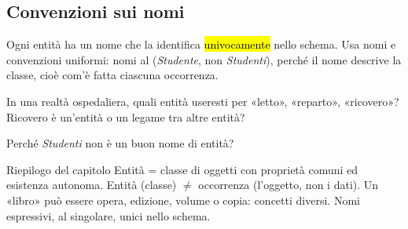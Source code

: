 \subsection{Convenzioni sui nomi}

\begin{consiglio}
Ogni entità ha un nome che la identifica \hl{univocamente} nello schema. Usa nomi  e convenzioni uniformi: nomi al  (\emph{Studente}, non \emph{Studenti}), perché il nome descrive la classe, cioè com'è fatta ciascuna occorrenza.
\end{consiglio}

\begin{esercizi}
\begin{passi}
  \item In una realtà ospedaliera, quali entità useresti per «letto», «reparto», «ricovero»? Ricovero è un'entità o un legame tra altre entità?
  \item Perché \emph{Studenti} non è un buon nome di entità?
\end{passi}
\end{esercizi}

\begin{appunti}{Riepilogo del capitolo}
 Entità = classe di oggetti con proprietà comuni ed esistenza autonoma.
 Entità (classe) $\neq$ occorrenza (l'oggetto, non i dati).
 Un «libro» può essere opera, edizione, volume o copia: concetti diversi.
 Nomi espressivi, al singolare, unici nello schema.
\end{appunti}
